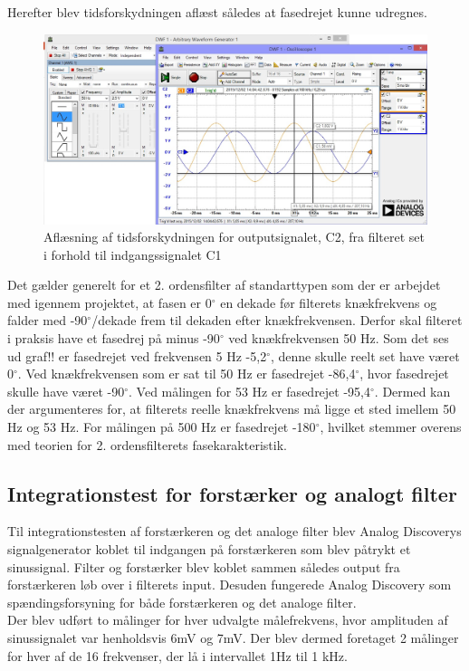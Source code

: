 Herefter blev tidsforskydningen aflæst således at fasedrejet kunne udregnes.

\begin{figure}[H]
	\centering
	\includegraphics[width=1\textwidth]{Figurer/Hardware/AnalogScreenFilter}
	\caption{Aflæsning af tidsforskydningen for outputsignalet, C2, fra filteret set i forhold til indgangssignalet C1}
	\label{fig:FilterTidsforskydning}
\end{figure}

Det gælder generelt for et 2. ordensfilter af standarttypen som der er arbejdet med igennem projektet, at fasen er 0$^{\circ}$ en dekade før filterets knækfrekvens og falder med -90$^{\circ}$/dekade frem til dekaden efter knækfrekvensen. Derfor skal filteret i praksis have et fasedrej på minus -90$^{\circ}$ ved knækfrekvensen 50 Hz. Som det ses ud graf!! er fasedrejet ved frekvensen 5 Hz -5,2$^{\circ}$, denne skulle reelt set have været 0$^{\circ}$. 
Ved knækfrekvensen som er sat til 50 Hz er fasedrejet -86,4$^{\circ}$, hvor fasedrejet skulle have været -90$^{\circ}$. Ved målingen for 53 Hz er fasedrejet -95,4$^{\circ}$. Dermed kan der argumenteres for, at filterets reelle knækfrekvens må ligge et sted imellem 50 Hz og 53 Hz. 
For målingen på 500 Hz er fasedrejet -180$^{\circ}$, hvilket stemmer overens med teorien for 2. ordensfilterets fasekarakteristik.

\subsection{Integrationstest for forstærker og analogt filter}
Til integrationstesten af forstærkeren og det analoge filter blev Analog Discoverys signalgenerator koblet til indgangen på forstærkeren som blev påtrykt et sinussignal. Filter og forstærker blev koblet sammen således output fra forstærkeren løb over i filterets input. Desuden fungerede Analog Discovery som spændingsforsyning for både forstærkeren og det analoge filter.\\
Der blev udført to målinger for hver udvalgte målefrekvens, hvor amplituden af sinussignalet var henholdsvis 6mV og 7mV. Der blev dermed foretaget 2 målinger for hver af de 16 frekvenser, der lå i intervallet 1Hz til 1 kHz. 

